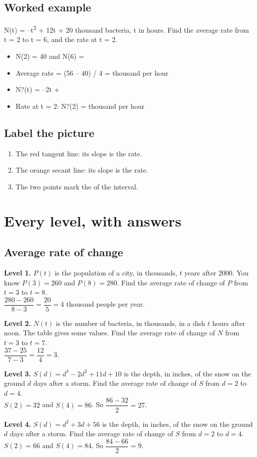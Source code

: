 \documentclass[11pt]{article}
\begin{document}
\subsection*{Worked example}
N(t) = --t\textsuperscript{2} + 12t + 20 thousand bacteria, t in hours. Find the average rate from t = 2 to t = 6, and the rate at t = 2.\\
\begin{itemize}
\item N(2) = 40 and N(6) = 
\item Average rate = (56 -- 40) / 4 =  thousand per hour
\item N?(t) = --2t + 
\item Rate at t = 2: N?(2) =  thousand per hour
\end{itemize}
\subsection*{Label the picture}
\begin{enumerate}
\item The red tangent line: its slope is the  rate.
\item The orange secant line: its slope is the  rate.
\item The two points mark the  of the interval.
\end{enumerate}
\section*{Every level, with answers}
\subsection*{Average rate of change}
\noindent\textbf{Level 1.} $P(t)$ is the population of a city, in thousands, $t$ years after 2000. You know $P(3)=260$ and $P(8)=280$. Find the average rate of change of $P$ from $t=3$ to $t=8$.\\  \quad $\dfrac{280-260}{8-3}=\dfrac{20}{5}=4$ thousand people per year.\par\medskip
\noindent\textbf{Level 2.} $N(t)$ is the number of bacteria, in thousands, in a dish $t$ hours after noon. The table gives some values. Find the average rate of change of $N$ from $t=3$ to $t=7$.\\  \quad $\dfrac{37-25}{7-3}=\dfrac{12}{4}=3$.\par\medskip
\noindent\textbf{Level 3.} $S(d)=d^{3}-2d^{2}+11d+10$ is the depth, in inches, of the snow on the ground $d$ days after a storm. Find the average rate of change of $S$ from $d=2$ to $d=4$.\\  \quad $S(2)=32$ and $S(4)=86$. So $\dfrac{86-32}{2}=27$.\par\medskip
\noindent\textbf{Level 4.} $S(d)=d^{2}+3d+56$ is the depth, in inches, of the snow on the ground $d$ days after a storm. Find the average rate of change of $S$ from $d=2$ to $d=4$.\\  \quad $S(2)=66$ and $S(4)=84$. So $\dfrac{84-66}{2}=9$.\par\medskip
\end{document}
